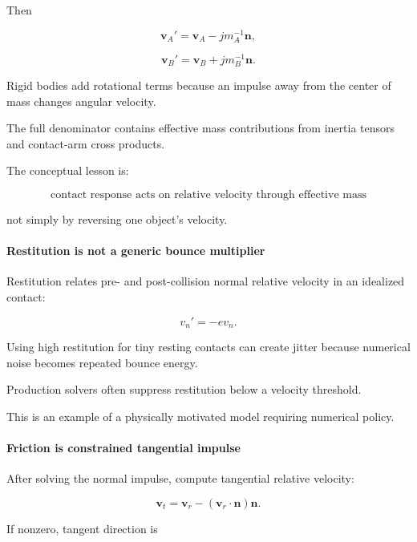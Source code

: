 Then

\[
\mathbf v_A'
=
\mathbf v_A
-
j m_A^{-1}\mathbf n,
\]

\[
\mathbf v_B'
=
\mathbf v_B
+
j m_B^{-1}\mathbf n.
\]

Rigid bodies add rotational terms because an impulse away from the center of mass changes angular velocity.

The full denominator contains effective mass contributions from inertia tensors and contact-arm cross products.

The conceptual lesson is:

\[
\boxed{
\text{contact response acts on relative velocity through effective mass}
}
\]

not simply by reversing one object's velocity.

\paragraph{Restitution is not a generic bounce multiplier}\label{03-visual-computing-i-ch001-restitution-is-not-a-generic-bounce-multiplier}

\hypertarget{03-visual-computing-i-ch001-restitution-is-not-a-generic-bounce-multiplier}{}

Restitution relates pre- and post-collision normal relative velocity in an idealized contact:

\[
v_n'
=
-e v_n.
\]

Using high restitution for tiny resting contacts can create jitter because numerical noise becomes repeated bounce energy.

Production solvers often suppress restitution below a velocity threshold.

This is an example of a physically motivated model requiring numerical policy.

\paragraph{Friction is constrained tangential impulse}\label{03-visual-computing-i-ch001-friction-is-constrained-tangential-impulse}

\hypertarget{03-visual-computing-i-ch001-friction-is-constrained-tangential-impulse}{}

After solving the normal impulse, compute tangential relative velocity:

\[
\mathbf v_t
=
\mathbf v_r
-
(\mathbf v_r\cdot\mathbf n)\mathbf n.
\]

If nonzero, tangent direction is

